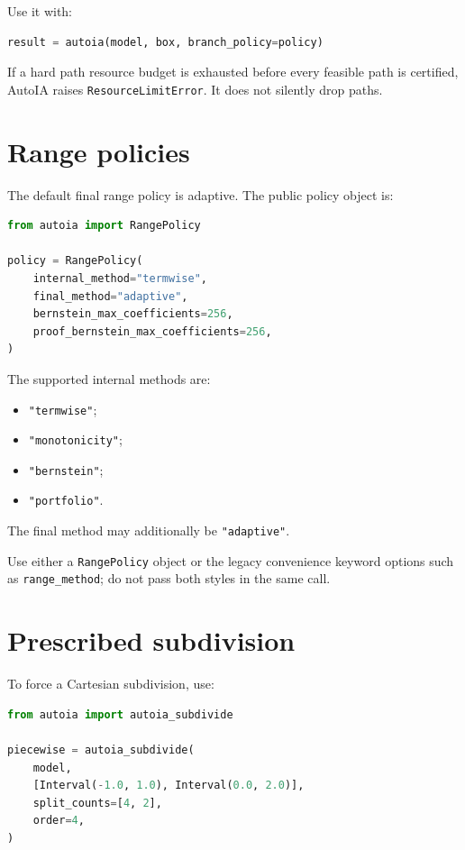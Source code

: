 \documentclass[11pt]{article}
\begin{document}
Use it with:
\begin{lstlisting}[language=Python]
result = autoia(model, box, branch_policy=policy)
\end{lstlisting}

If a hard path resource budget is exhausted before every feasible path is
certified, AutoIA raises \texttt{ResourceLimitError}.  It does not silently drop
paths.

\section{Range policies}

The default final range policy is adaptive.  The public policy object is:
\begin{lstlisting}[language=Python]
from autoia import RangePolicy

policy = RangePolicy(
    internal_method="termwise",
    final_method="adaptive",
    bernstein_max_coefficients=256,
    proof_bernstein_max_coefficients=256,
)
\end{lstlisting}

The supported internal methods are:
\begin{itemize}[leftmargin=*]
\item \texttt{"termwise"};
\item \texttt{"monotonicity"};
\item \texttt{"bernstein"};
\item \texttt{"portfolio"}.
\end{itemize}
The final method may additionally be \texttt{"adaptive"}.

Use either a \texttt{RangePolicy} object or the legacy convenience keyword
options such as \texttt{range\_method}; do not pass both styles in the same call.

\section{Prescribed subdivision}

To force a Cartesian subdivision, use:
\begin{lstlisting}[language=Python]
from autoia import autoia_subdivide

piecewise = autoia_subdivide(
    model,
    [Interval(-1.0, 1.0), Interval(0.0, 2.0)],
    split_counts=[4, 2],
    order=4,
)
\end{lstlisting}
\end{document}
